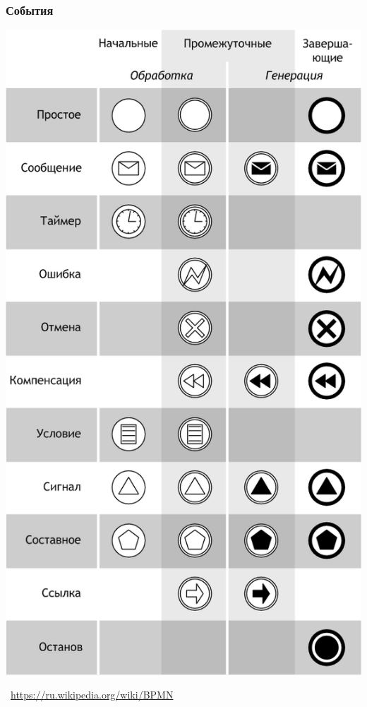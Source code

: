 \documentclass[xetex,mathserif,serif]{beamer}
\newcommand{\attribution}[1] {
    \vspace{-5mm}\begin{flushright}\begin{scriptsize}\textcolor{gray}{\textcopyright\, #1}\end{scriptsize}\end{flushright}
}
\begin{document}
    \begin{frame}
        \frametitle{События}
        \begin{center}
            \includegraphics[height=0.8\textheight]{bpmnEvents.png}
            \attribution{\url{https://ru.wikipedia.org/wiki/BPMN}}
        \end{center}
    \end{frame}
\end{document}
